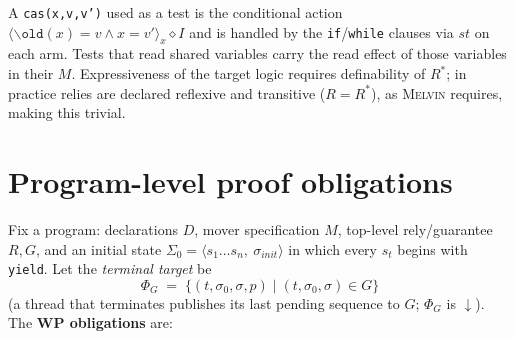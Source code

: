 \documentclass[11pt]{article}
\theoremstyle{plain}
\theoremstyle{plain}
\theoremstyle{definition}
\newcommand{\stp}{\mathit{st}}
\newcommand{\dcl}{\ensuremath{\downarrow}\text{-closed}}
\newcommand{\cact}[2]{#1\diamond #2}                 %
\newcommand{\oldx}[1]{\mathtt{\backslash old}(#1)}
\newcommand{\melvin}{\textsc{Melvin}}
\newcommand{\code}[1]{\texttt{#1}}
\begin{document}
A \code{cas(x,v,v')} used as a test is the conditional action
$\cact{\langle \oldx{x}=v \wedge x=v'\rangle_x}{I}$ and is handled by the
\code{if}/\code{while} clauses via $\stp$ on each arm. Tests that read shared
variables carry the read effect of those variables in their $M$. Expressiveness of
the target logic requires definability of $R^*$; in practice relies are declared
reflexive and transitive ($R = R^*$), as \melvin{} requires, making this trivial.

\section{Program-level proof obligations}\label{sec:obligations}

Fix a program: declarations $D$, mover specification $M$, top-level rely/guarantee
$R,G$, and an initial state
$\Sigma_{0} = \langle s_1\ldots s_n,\ \sigma_{\mathit{init}}\rangle$ in which every
$s_t$ begins with \code{yield}. Let the \emph{terminal target} be
\[
\Phi_G \;=\; \{(t,\sigma_0,\sigma,p)\mid (t,\sigma_0,\sigma)\in G\}
\]
(a thread that terminates publishes its last pending sequence to $G$; $\Phi_G$ is
\dcl). The \textbf{WP obligations} are:
\end{document}
